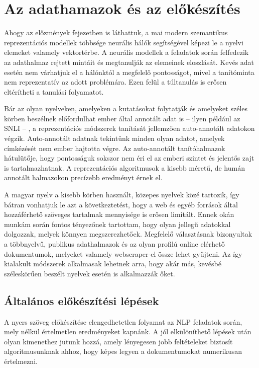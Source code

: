 \chapter{Az adathamazok és az előkészítés}
\label{ch:datasets}

Ahogy az előzmények fejezetben is láthattuk, a mai modern szemantikus reprezentációs modellek többsége neurális hálók segítségével képezi le a nyelvi elemeket valamely vektortérbe. A neurális modellek a feladatok során felfedezik az adathalmaz rejtett mintáit és megtanulják az elemeinek eloszlását. Kevés adat esetén nem várhatjuk el a hálónktól a megfelelő pontosságot, mivel a tanítóminta nem reprezentatív az adott problémára. Ezen felül a túltanulás is erősen eltérítheti a tanulási folyamatot.

Bár az olyan nyelveken, amelyeken a kutatásokat folytatják és amelyeket széles körben beszélnek előfordulhat ember által annotált adat is – ilyen például az SNLI – , a reprezentációs módszerek tanítását jellemzően auto-annotált adatokon végzik. Auto-annotált adatnak tekintünk minden olyan adatot, amelyek címkézését nem ember hajtotta végre. Az auto-annotált tanítóhalmazok hátulütője, hogy pontosságuk sokszor nem éri el az emberi szintet és jelentős zajt is tartalmazhatnak. A reprezentációs algoritmusok a kisebb méretű, de humán annotált halmazokon precízebb eredményt érnek el. \cite{infer}

A magyar nyelv a kisebb körben használt, közepes nyelvek közé tartozik, így bátran vonhatjuk le azt a következtetést, hogy a web és egyéb források által hozzáférhető szöveges tartalmak mennyisége is erősen limitált.
Ennek okán munkám során fontos tényezőnek tartottam, hogy olyan jellegű adatokkal dolgozzak, melyek könnyen megszerezhetőek. Megfelelő választásnak bizonyultak a többnyelvű, publikus adathalmazok és az olyan profilú online elérhető dokumentumok, melyeket valamely webscraper-el össze lehet gyűjteni. Az így kialakult módszerek alkalmasak lehetnek arra, hogy akár más, kevésbé széleskörűen beszélt nyelvek esetén is alkalmazzák őket.

\section{Általános előkészítési lépések}

A nyers szöveg előkészítése elengedhetetlen folyamat az NLP feladatok során, mely nélkül értelmetlen eredményeket kapnánk. A jól elkülöníthető lépések után olyan kimenethez jutunk hozzá, amely lényegesen jobb feltételeket biztosít algoritmusunknak ahhoz, hogy képes legyen a dokumentumokat numerikusan értelmezni.

